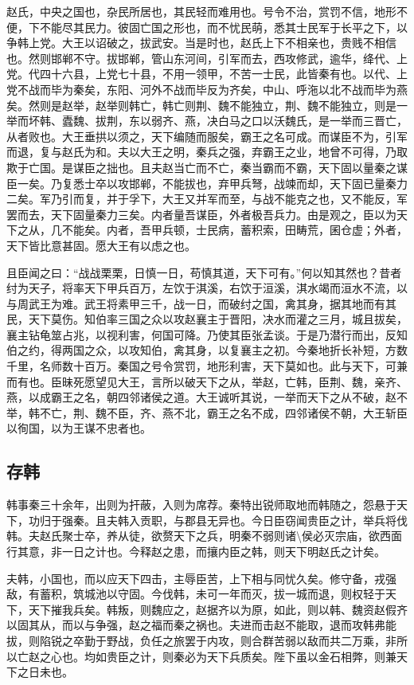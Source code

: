 \documentclass[]{article}
\begin{document}
赵氏，中央之国也，杂民所居也，其民轻而难用也。号令不治，赏罚不信，地形不便，下不能尽其民力。彼固亡国之形也，而不忧民萌，悉其士民军于长平之下，以争韩上党。大王以诏破之，拔武安。当是时也，赵氏上下不相亲也，贵贱不相信也。然则邯郸不守。拔邯郸，管山东河间，引军而去，西攻修武，逾华，绛代、上党。代四十六县，上党七十县，不用一领甲，不苦一士民，此皆秦有也。以代、上党不战而毕为秦矣，东阳、河外不战而毕反为齐矣，中山、呼沲以北不战而毕为燕矣。然则是赵举，赵举则韩亡，韩亡则荆、魏不能独立，荆、魏不能独立，则是一举而坏韩、蠹魏、拔荆，东以弱齐、燕，决白马之口以沃魏氏，是一举而三晋亡，从者败也。大王垂拱以须之，天下编随而服矣，霸王之名可成。而谋臣不为，引军而退，复与赵氏为和。夫以大王之明，秦兵之强，弃霸王之业，地曾不可得，乃取欺于亡国。是谋臣之拙也。且夫赵当亡而不亡，秦当霸而不霸，天下固以量秦之谋臣一矣。乃复悉士卒以攻邯郸，不能拔也，弃甲兵弩，战竦而却，天下固已量秦力二矣。军乃引而复，并于孚下，大王又并军而至，与战不能克之也，又不能反，军罢而去，天下固量秦力三矣。内者量吾谋臣，外者极吾兵力。由是观之，臣以为天下之从，几不能矣。内者，吾甲兵顿，士民病，蓄积索，田畴荒，囷仓虚；外者，天下皆比意甚固。愿大王有以虑之也。

且臣闻之曰：``战战栗栗，日慎一日，苟慎其道，天下可有。''何以知其然也？昔者纣为天子，将率天下甲兵百万，左饮于淇溪，右饮于洹溪，淇水竭而洹水不流，以与周武王为难。武王将素甲三千，战一日，而破纣之国，禽其身，据其地而有其民，天下莫伤。知伯率三国之众以攻赵襄主于晋阳，决水而灌之三月，城且拔矣，襄主钻龟筮占兆，以视利害，何国可降。乃使其臣张孟谈。于是乃潜行而出，反知伯之约，得两国之众，以攻知伯，禽其身，以复襄主之初。今秦地折长补短，方数千里，名师数十百万。秦国之号令赏罚，地形利害，天下莫如也。此与天下，可兼而有也。臣昧死愿望见大王，言所以破天下之从，举赵，亡韩，臣荆、魏，亲齐、燕，以成霸王之名，朝四邻诸侯之道。大王诚听其说，一举而天下之从不破，赵不举，韩不亡，荆、魏不臣，齐、燕不北，霸王之名不成，四邻诸侯不朝，大王斩臣以徇国，以为王谋不忠者也。

\hypertarget{header-n817}{%
\subsection{存韩}\label{header-n817}}

韩事秦三十余年，出则为扞蔽，入则为席荐。秦特出锐师取地而韩随之，怨悬于天下，功归于强秦。且夫韩入贡职，与郡县无异也。今日臣窃闻贵臣之计，举兵将伐韩。夫赵氏聚士卒，养从徒，欲赘天下之兵，明秦不弱则诸\textbackslash{}侯必灭宗庙，欲西面行其意，非一日之计也。今释赵之患，而攘内臣之韩，则天下明赵氏之计矣。

夫韩，小国也，而以应天下四击，主辱臣苦，上下相与同忧久矣。修守备，戎强敌，有蓄积，筑城池以守固。今伐韩，未可一年而灭，拔一城而退，则权轻于天下，天下摧我兵矣。韩叛，则魏应之，赵据齐以为原，如此，则以韩、魏资赵假齐以固其从，而以与争强，赵之福而秦之祸也。夫进而击赵不能取，退而攻韩弗能拔，则陷锐之卒勤于野战，负任之旅罢于内攻，则合群苦弱以敌而共二万乘，非所以亡赵之心也。均如贵臣之计，则秦必为天下兵质矣。陛下虽以金石相弊，则兼天下之日未也。
\end{document}
